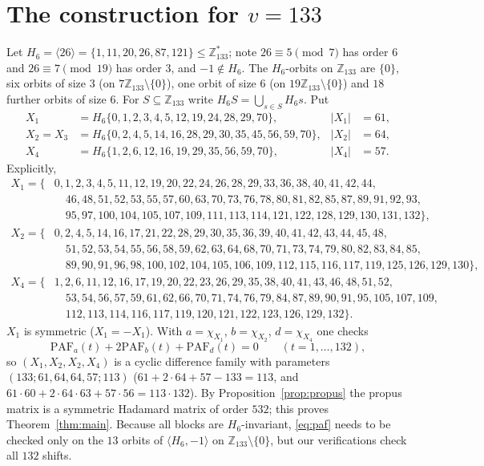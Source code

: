 \documentclass[11pt]{article}
\numberwithin{equation}{section}
\theoremstyle{definition}
\theoremstyle{remark}
\newcommand{\Z}{\mathbb Z}
\newcommand{\PAF}{\mathrm{PAF}}
\begin{document}
\section{The construction for $v=133$}\label{sec:constr}
Let $H_6=\langle 26\rangle=\{1,11,20,26,87,121\}\le\Z_{133}^{*}$; note $26\equiv5\pmod 7$ has order $6$
and $26\equiv7\pmod{19}$ has order $3$, and $-1\notin H_6$. The $H_6$-orbits on $\Z_{133}$ are $\{0\}$,
six orbits of size $3$ (on $7\Z_{133}\setminus\{0\}$), one orbit of size $6$ (on $19\Z_{133}\setminus\{0\}$) and
$18$ further orbits of size $6$. For $S\subseteq\Z_{133}$ write $H_6S=\bigcup_{s\in S}H_6s$. Put
\begin{align*}
X_1&=H_6\{0,1,2,3,4,5,12,19,24,28,29,70\}, & |X_1|&=61,\\
X_2=X_3&=H_6\{0,2,4,5,14,16,28,29,30,35,45,56,59,70\}, & |X_2|&=64,\\
X_4&=H_6\{1,2,6,12,16,19,29,35,56,59,70\}, & |X_4|&=57.
\end{align*}
Explicitly,
{\small
\begin{align*}
X_1=\{&0, 1, 2, 3, 4, 5, 11, 12, 19, 20, 22, 24, 26, 28, 29, 33, 36, 38, 40, 41, 42, 44,\\&\quad 46, 48, 51, 52, 53, 55, 57, 60, 63, 70, 73, 76, 78, 80, 81, 82, 85, 87, 89, 91, 92, 93,\\&\quad 95, 97, 100, 104, 105, 107, 109, 111, 113, 114, 121, 122, 128, 129, 130, 131, 132\},\\
X_2=\{&0, 2, 4, 5, 14, 16, 17, 21, 22, 28, 29, 30, 35, 36, 39, 40, 41, 42, 43, 44, 45, 48,\\&\quad 51, 52, 53, 54, 55, 56, 58, 59, 62, 63, 64, 68, 70, 71, 73, 74, 79, 80, 82, 83, 84, 85,\\&\quad 89, 90, 91, 96, 98, 100, 102, 104, 105, 106, 109, 112, 115, 116, 117, 119, 125, 126, 129, 130\},\\
X_4=\{&1, 2, 6, 11, 12, 16, 17, 19, 20, 22, 23, 26, 29, 35, 38, 40, 41, 43, 46, 48, 51, 52,\\&\quad 53, 54, 56, 57, 59, 61, 62, 66, 70, 71, 74, 76, 79, 84, 87, 89, 90, 91, 95, 105, 107, 109,\\&\quad 112, 113, 114, 116, 117, 119, 120, 121, 122, 123, 126, 129, 132\}.
\end{align*}}
$X_1$ is symmetric ($X_1=-X_1$). With $a=\chi_{X_1}$, $b=\chi_{X_2}$, $d=\chi_{X_4}$ one checks
\begin{equation}\label{eq:paf}
\PAF_a(t)+2\PAF_b(t)+\PAF_d(t)=0\qquad(t=1,\dots,132),
\end{equation}
so $(X_1,X_2,X_2,X_4)$ is a cyclic difference family with parameters $(133;61,64,64,57;113)$
($61+2\cdot64+57-133=113$, and $61\cdot60+2\cdot64\cdot63+57\cdot56=113\cdot132$). By
Proposition~\ref{prop:propus} the propus matrix is a symmetric Hadamard matrix of order $532$; this
proves Theorem~\ref{thm:main}. Because all blocks are $H_6$-invariant, \eqref{eq:paf} needs to be
checked only on the $13$ orbits of $\langle H_6,-1\rangle$ on $\Z_{133}\setminus\{0\}$, but our
verifications check all $132$ shifts.
\end{document}

